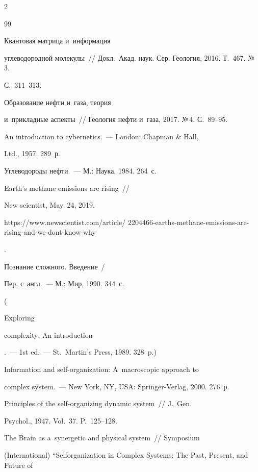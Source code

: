 \begin{multicols}{2}
{{\begin{thebibliography}{99}

     Квантовая матрица и~информация 

углеводородной молекулы~// Докл.\ Акад. наук. Сер. Геология, 2016. Т.~467. №\,3.  

С.~311--313.


     Образование нефти и~газа, тео\-рия 

и~прикладные аспекты~// Геология нефти и~газа, 2017. №\,4. С.~89--95.


     An introduction to cybernetics.~--- London: Chapman \& Hall, 

Ltd., 1957. 289~р.


     Углеводороды нефти.~--- М.: Наука, 1984. 264~с.


    Earth's methane emissions are rising~//

     New scientist, May~24, 2019. {\sf 

https://www.newscientist.com/article/ 2204466-earths-methane-emissions-are-rising-and-we-dont-know-why}.


     Познание сложного. Введение~/

    Пер. с~англ.~--- М.: Мир,  1990. 344~с.

    (  {Exploring 

complexity: An introduction}.~--- 1st ed.~--- St.\ Martin's Press, 1989. 328~p.)


     Information and self-organization: A~macroscopic approach to 

complex system.~--- New York, NY, USA: Springer-Verlag, 2000. 276~р.


     Principles of the self-organizing dynamic system~// J.~Gen. 

Psychol., 1947. Vol.~37. P.~125--128.


     The Brain as a~synergetic and physical system~// Symposium 

(International) ``Selforganization in Complex Systems: The Past, Present, and Future of 


\end{thebibliography}}}
\end{multicols}
